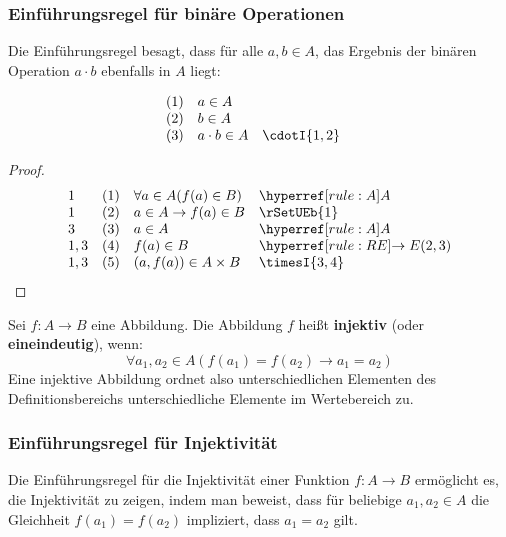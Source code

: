 \documentclass[main.tex]{subfiles}
\begin{document}
\subsubsection*{Einführungsregel für binäre Operationen}
\label{rule:cdotI}

Die Einführungsregel besagt, dass für alle \( a, b \in A \), das Ergebnis der binären Operation \( a \cdot b \) ebenfalls in \( A \) liegt:

\[
\begin{array}{llll}
    (1) & a \in A & & \\
    (2) & b \in A & & \\
    (3) & a \cdot b \in A & \cdotI{1,2} & 
\end{array}
\]


\begin{theorem}
\end{theorem}
\begin{proof}
	\[
	\begin{array}{llll}
		1   &  (1) & \forall a\in A(f(a)\in B) & \rA \\
            1   &  (2) & a\in A\rightarrow f(a)\in B & \rSetUEb{1} \\
            3   &  (3) & a\in A & \rA \\
            1,3 &  (4) & f(a)\in B & \rRE{2,3} \\
            1,3 &  (5) & (a,f(a))\in A\times B & \timesI{3,4} \\
	\end{array}
	\]
\end{proof}

\begin{definition}[Injektivität]
    Sei \( f: A \to B \) eine Abbildung. Die Abbildung \( f \) heißt \textbf{injektiv} (oder \textbf{eineindeutig}), wenn:
    \[
    \forall a_1,a_2\in A(f(a_1) = f(a_2) \rightarrow a_1 = a_2)
    \]
    Eine injektive Abbildung ordnet also unterschiedlichen Elementen des Definitionsbereichs unterschiedliche Elemente im Wertebereich zu.
\end{definition}

\subsubsection*{Einführungsregel für Injektivität}
\label{rule:InjI}

Die Einführungsregel für die Injektivität einer Funktion \( f: A \to B \) ermöglicht es, die Injektivität zu zeigen, indem man beweist, dass für beliebige \( a_1, a_2 \in A \) die Gleichheit \( f(a_1) = f(a_2) \) impliziert, dass \( a_1 = a_2 \) gilt.
\end{document}
